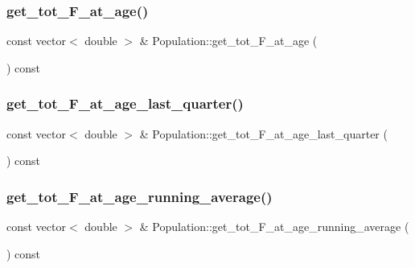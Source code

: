 \subsubsection{\texorpdfstring{get\_tot\_F\_at\_age()}{get\_tot\_F\_at\_age()}}
{\footnotesize\ttfamily const vector$<$ double $>$ \& Population\+::get\+\_\+tot\+\_\+\+F\+\_\+at\+\_\+age (\begin{DoxyParamCaption}{ }\end{DoxyParamCaption}) const}

\mbox{\label{class_population_a17c2aca418aa72a6bde1e17439a71067}} 
\subsubsection{\texorpdfstring{get\_tot\_F\_at\_age\_last\_quarter()}{get\_tot\_F\_at\_age\_last\_quarter()}}
{\footnotesize\ttfamily const vector$<$ double $>$ \& Population\+::get\+\_\+tot\+\_\+\+F\+\_\+at\+\_\+age\+\_\+last\+\_\+quarter (\begin{DoxyParamCaption}{ }\end{DoxyParamCaption}) const}

\mbox{\label{class_population_a4169ce7af337dcc8551957e3b51040ce}} 
\subsubsection{\texorpdfstring{get\_tot\_F\_at\_age\_running\_average()}{get\_tot\_F\_at\_age\_running\_average()}}
{\footnotesize\ttfamily const vector$<$ double $>$ \& Population\+::get\+\_\+tot\+\_\+\+F\+\_\+at\+\_\+age\+\_\+running\+\_\+average (\begin{DoxyParamCaption}{ }\end{DoxyParamCaption}) const}

\mbox{\label{class_population_aaab9bd4e9065d855854360f3545d18fc}} 
